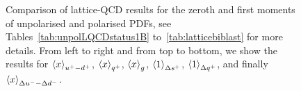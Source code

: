 \begin{figure}[t]
\begin{center}
{}
\centerline{
}
\end{center}
\caption{\small Comparison of lattice-QCD results for
  the  zeroth and first moments
  of unpolarised and polarised PDFs,
  see Tables~\ref{tab:unpolLQCDstatus1B} to~\ref{tab:latticebiblast}
  for more details.
  From left to right and from top to bottom, we show
  the results for $\left\langle x\right\rangle_{u^+-d^+}$, $\left\langle x\right\rangle_{q^+}$, $\left\langle x\right\rangle_{g}$,
  $\left\langle 1 \right\rangle_{\Delta s^+}$, $\left\langle 1\right\rangle_{\Delta q^+}$, and finally
  $\left\langle x\right\rangle_{\Delta u^- - \Delta d^-}$.
}
\label{fig:latt_res}
\end{figure}


